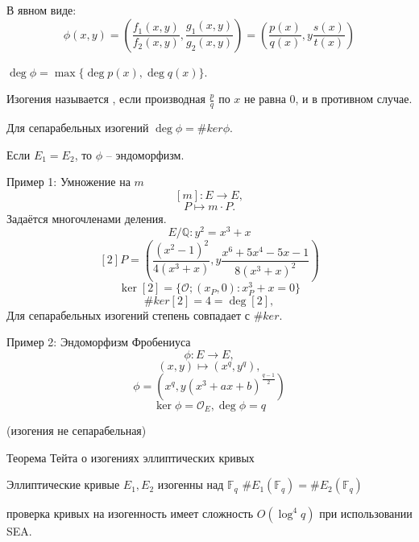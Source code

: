 \documentclass{beamer}
\begin{document}
\begin{frame}
    В явном виде:
	\[
	\phi(x, y) = \left( \frac{f_1(x,y)}{f_2(x,y)}, \frac{g_1(x,y)}{g_2(x,y)} \right)
	=
	\left(
	\frac{p(x)}{q(x)}, y \frac{s(x)}{t(x)}
	\right)
	\]
	
	\vspace*{1em}
	 $\deg\phi = \max\{\deg{p(x)}, \deg{q(x)}\}$.
	
	\vspace{1em}
	Изогения называется , если производная $\frac{p}{q}$ по $x$ не равна $0$, и  в противном случае.
	
	\vspace{1em}
	Для сепарабельных изогений $\deg\phi = \#ker\phi$.
	
	\vspace{1em}
	Если $E_1 = E_2$, то $\phi$ -- эндоморфизм.
	
\end{frame}

\begin{frame}{Пример 1: Умножение на $m$}
    \[[m]: E \rightarrow E,\]
    \[P \mapsto m \cdot P.\]
Задаётся многочленами деления.
\[E/\mathbb{Q}: y^2 = x^3 + x\]
\[
[2]P = \left( \frac{(x^2-1)^2}{4 (x^3 + x)}, y \frac{x^6 + 5 x^4 - 5 x - 1}{8 (x^3 + x)^2} \right)
\]
\[
\ker[2] = \{ \mathcal{O}; (x_P,0): x_P^3 + x = 0\}
\]
\[\#ker[2] = 4 = \deg[2],\]
Для сепарабельных изогений степень совпадает с $\#ker$.
\end{frame}

\begin{frame}{Пример 2: Эндоморфизм Фробениуса}
\[\phi: E \rightarrow E,\]
\[(x,y) \mapsto (x^q, y^q),\]
\[
\phi = (x^q, y (x^3 + a x + b)^{\frac{q-1}{2}})
\]
\[
\ker{\phi} = \mathcal{O}_E, \deg{\phi} = q
\]
\begin{center}
(изогения не сепарабельная)
\end{center}
\end{frame}

\begin{frame}{Теорема Тейта о изогениях эллиптических кривых}
	\begin{center}
		Эллиптические кривые $E_1, E_2$ изогенны над $\mathbb{F}_q$ \structure{$\iff$} $\#E_1(\mathbb{F}_q) = \#E_2(\mathbb{F}_q)$
	\end{center}
		 проверка кривых на изогенность имеет сложность $O(\log^4{q})$ при использовании SEA.
\end{frame}
\end{document}
